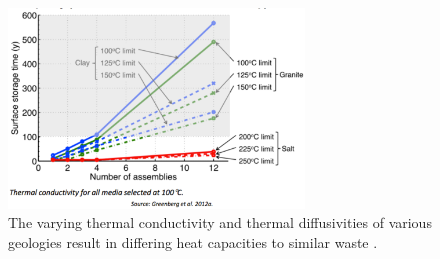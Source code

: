 \begin{figure}[htbp!]
  \begin{center}
    \includegraphics[width=0.7\textwidth]{greenberg_thermal.eps}
  \end{center}
  \caption{The varying thermal conductivity and thermal diffusivities of various 
    geologies result in differing heat capacities to similar waste 
    \cite{greenberg_application_2012}.}
  \label{fig:greenberg_thermal}
\end{figure}
